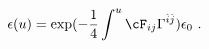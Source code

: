 \begin{equation}
 \epsilon (u) = 
 \exp ( - \frac{1}{4} \int^u  \cF_{ij} \Gamma^{\hat{i} \hat{j}} ) \epsilon_0 ~.
\end{equation}

